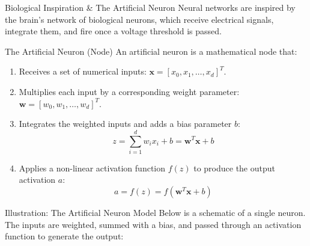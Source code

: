 \documentclass[9pt]{beamer}
\begin{document}
\begin{frame}{Biological Inspiration \& The Artificial Neuron}
  Neural networks are inspired by the brain's network of biological neurons, which receive electrical signals, integrate them, and fire once a voltage threshold is passed.
  \begin{block}{The Artificial Neuron (Node)}
    An artificial neuron is a mathematical node that:
    \begin{enumerate}
      \item Receives a set of numerical inputs: $\mathbf{x} = [x_0, x_1, \dots, x_d]^T$.
      \item Multiplies each input by a corresponding weight parameter: $\mathbf{w} = [w_0, w_1, \dots, w_d]^T$.
      \item Integrates the weighted inputs and adds a bias parameter $b$:
        $$z = \sum_{i=1}^d w_i x_i + b = \mathbf{w}^T \mathbf{x} + b$$
      \item Applies a non-linear activation function $f(z)$ to produce the output activation $a$:
        $$a = f(z) = f(\mathbf{w}^T \mathbf{x} + b)$$
    \end{enumerate}
  \end{block}
\end{frame}

\begin{frame}{Illustration: The Artificial Neuron Model}
  Below is a schematic of a single neuron. The inputs are weighted, summed with a bias, and passed through an activation function to generate the output:
  \vfill
  \centering
  \vfill
\end{frame}
\end{document}
